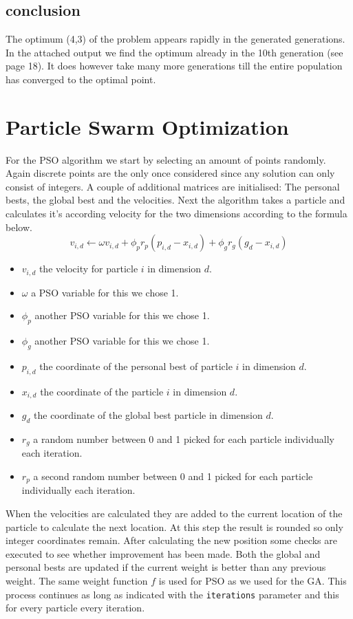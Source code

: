 \documentclass[11pt,a4paper,oneside]{article}
\begin{document}
\subsection{conclusion}
The optimum (4,3) of the problem appears rapidly in the generated generations.
In the attached output we find the optimum already in the 10th generation (see page 18).
It does however take many more generations till the entire population has converged to the optimal point.

\section{Particle Swarm Optimization}
For the PSO algorithm we start by selecting an amount of points randomly. 
Again discrete points are the only once considered since any solution can only consist of integers.
A couple of additional matrices are initialised: The personal bests, the global best and the velocities.
Next the algorithm takes a particle and calculates it's according velocity for the two dimensions according to the formula below.
$$v_{i,d} \leftarrow \omega v_{i,d} + \phi_p r_p (p_{i,d} - x_{i,d} ) + \phi_g r_g (g_d - x_{i,d}) $$
\begin{itemize}
		\item $v_{i,d}$ the velocity for particle $i$ in dimension $d$. 
		\item $\omega$ a PSO variable for this we chose 1. 
		\item $\phi_p$ another PSO variable for this we chose 1. 
		\item $\phi_g$ another PSO variable for this we chose 1. 
		\item $p_{i,d}$ the coordinate of the personal best of particle $i$ in dimension $d$. 
		\item $x_{i,d}$ the coordinate of the particle $i$ in dimension $d$. 
		\item $g_d$ the coordinate of the global best particle in dimension $d$. 
		\item $r_g$ a random number between 0 and 1 picked for each particle individually each iteration. 
		\item $r_p$ a second random number between 0 and 1 picked for each particle individually each iteration. 
\end{itemize}
When the velocities are calculated they are added to the current location of the particle to calculate the next location.
At this step the result is rounded so only integer coordinates remain.
After calculating the new position some checks are executed to see whether improvement has been made.
Both the global and personal bests are updated if the current weight is better than any previous weight.
The same weight function $f$ is used for PSO as we used for the GA.
This process continues as long as indicated with the \texttt{iterations} parameter and this for every particle every iteration.
\end{document}
